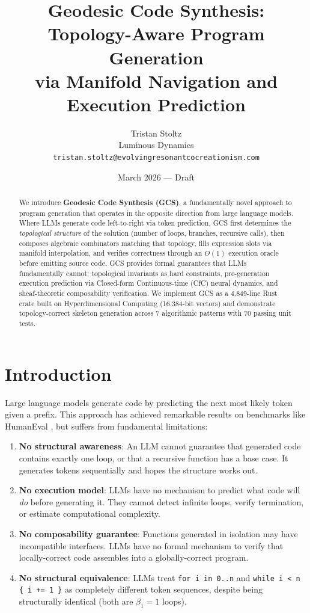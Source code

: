\documentclass[11pt,a4paper]{article}
\title{Geodesic Code Synthesis:\\
Topology-Aware Program Generation\\
via Manifold Navigation and Execution Prediction}
\author{Tristan Stoltz\\
Luminous Dynamics\\
\texttt{tristan.stoltz@evolvingresonantcocreationism.com}}
\date{March 2026 — Draft}
\begin{document}
\maketitle

\begin{abstract}
We introduce \textbf{Geodesic Code Synthesis (GCS)}, a fundamentally novel approach to
program generation that operates in the opposite direction from large language models.
Where LLMs generate code left-to-right via token prediction, GCS first determines the
\emph{topological structure} of the solution (number of loops, branches, recursive calls),
then composes algebraic combinators matching that topology, fills expression slots via
manifold interpolation, and verifies correctness through an $O(1)$ execution oracle
before emitting source code. GCS provides formal guarantees that LLMs fundamentally
cannot: topological invariants as hard constraints, pre-generation execution prediction
via Closed-form Continuous-time (CfC) neural dynamics, and sheaf-theoretic composability
verification. We implement GCS as a 4,849-line Rust crate built on Hyperdimensional
Computing (16,384-bit vectors) and demonstrate topology-correct skeleton generation
across 7 algorithmic patterns with 70 passing unit tests.
\end{abstract}

\section{Introduction}

Large language models generate code by predicting the next most likely token given
a prefix. This approach has achieved remarkable results on benchmarks like HumanEval
\cite{chen2021codex}, but suffers from fundamental limitations:

\begin{enumerate}
    \item \textbf{No structural awareness}: An LLM cannot guarantee that generated
    code contains exactly one loop, or that a recursive function has a base case.
    It generates tokens sequentially and hopes the structure works out.

    \item \textbf{No execution model}: LLMs have no mechanism to predict what code
    will \emph{do} before generating it. They cannot detect infinite loops, verify
    termination, or estimate computational complexity.

    \item \textbf{No composability guarantee}: Functions generated in isolation may
    have incompatible interfaces. LLMs have no formal mechanism to verify that
    locally-correct code assembles into a globally-correct program.

    \item \textbf{No structural equivalence}: LLMs treat \texttt{for i in 0..n}
    and \texttt{while i < n \{ i += 1 \}} as completely different token sequences,
    despite being structurally identical (both are $\beta_1 = 1$ loops).
\end{enumerate}
\end{document}
